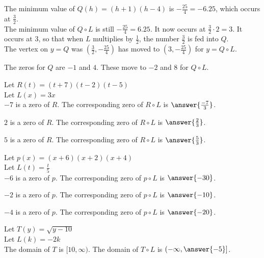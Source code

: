 \documentclass{ximera}
\begin{document}
The minimum value of $Q(h) = (h+1)(h-4)$ is $-\frac{25}{4} = -6.25$, which occurs at $\frac{3}{2}$. \\

The minimum value of $Q \circ L$ is still $-\frac{25}{4} = 6.25$. It now occurs at $\frac{3}{2} \cdot 2 = 3$.  It occurs at $3$, so that when $L$ multiplies by $\frac{1}{2}$, the number $\frac{3}{2}$ is fed into $Q$. \\


The vertex on $y = Q$ was $\left (\frac{3}{2}, -\frac{25}{4} \right)$ has moved to $\left (3, -\frac{25}{4} \right)$ for $y = Q \circ L$.


The zeros for $Q$ are $-1$ and $4$.  These move to $-2$ and $8$ for $Q \circ L$.  




\begin{question}


Let $R(t) = (t+7)(t-2)(t-5)$ \\

Let $L(x) = 3x$ \\


$-7$ is a zero of $R$.  The corresponding zero of $R \circ L$ is $\answer{\frac{-7}{3}}$.

$2$ is a zero of $R$.  The corresponding zero of $R \circ L$ is $\answer{\frac{2}{3}}$.

$5$ is a zero of $R$.  The corresponding zero of $R \circ L$ is $\answer{\frac{5}{3}}$.


\end{question}












\begin{question}


Let $p(x) = (x+6)(x+2)(x+4)$ \\

Let $L(t) = \frac{t}{5}$ \\


$-6$ is a zero of $p$.  The corresponding zero of $p \circ L$ is $\answer{-30}$.

$-2$ is a zero of $p$.  The corresponding zero of $p \circ L$ is $\answer{-10}$.

$-4$ is a zero of $p$.  The corresponding zero of $p \circ L$ is $\answer{-20}$.


\end{question}










\begin{question}


Let $T(y) = \sqrt{y-10}$ \\

Let $L(k) = -2k$ \\


The domain of $T$ is $[10, \infty)$.  The domain of $T \circ L$ is $\left( -\infty, \answer{-5} \right]$.


\end{question}
\end{document}
